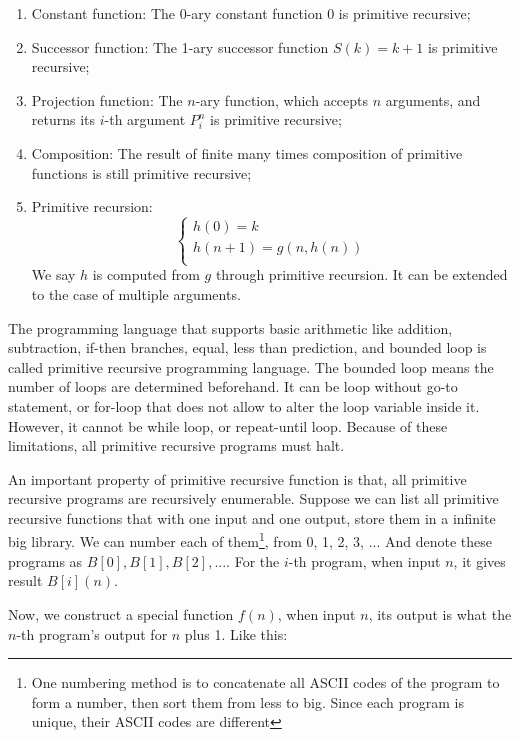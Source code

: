 \documentclass{article}
\begin{document}
\begin{enumerate}
\item Constant function: The 0-ary constant function 0 is primitive recursive;

\item Successor function: The 1-ary successor function $S(k) = k + 1$ is primitive recursive;

\item Projection function: The $n$-ary function, which accepts $n$ arguments, and returns its $i$-th argument $P_i^n$ is primitive recursive;

\item Composition: The result of finite many times composition of primitive functions is still primitive recursive;

\item Primitive recursion:
\[
\begin{cases}
h(0) = k \\
h(n + 1) = g(n, h(n)) \\
\end{cases}
\]
We say $h$ is computed from $g$ through primitive recursion. It can be extended to the case of multiple arguments.
\end{enumerate}

The programming language that supports basic arithmetic like addition, subtraction, if-then branches, equal, less than prediction, and bounded loop is called primitive recursive programming language. The bounded loop means the number of loops are determined beforehand. It can be loop without go-to statement, or for-loop that does not allow to alter the loop variable inside it. However, it cannot be while loop, or repeat-until loop. Because of these limitations, all primitive recursive programs must halt.

An important property of primitive recursive function is that, all primitive recursive programs are recursively enumerable. Suppose we can list all primitive recursive functions that with one input and one output, store them in a infinite big library. We can number each of them\footnote{One numbering method is to concatenate all ASCII codes of the program to form a number, then sort them from less to big. Since each program is unique, their ASCII codes are different}, from 0, 1, 2, 3, ... And denote these programs as $B[0], B[1], B[2], ...$. For the $i$-th program, when input $n$, it gives result $B[i](n)$.

Now, we construct a special function $f(n)$, when input $n$, its output is what the $n$-th program's output for $n$ plus 1. Like this:
\end{document}
